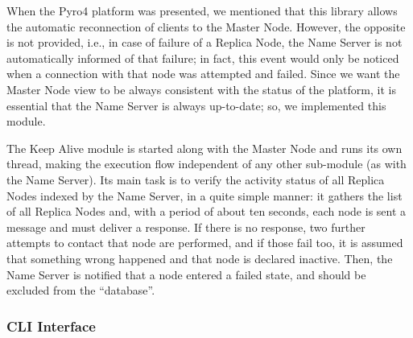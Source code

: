 

When the Pyro4 platform was presented, we mentioned that this library allows the automatic reconnection of clients to the Master Node. However, the opposite is not provided, i.e., in case of failure of a Replica Node, the Name Server is not automatically informed of that failure; in fact, this event would only be noticed when a connection with that node was attempted and failed.
Since we want the Master Node view to be always consistent with the status of the platform, it is essential that the Name Server is always up-to-date; so, we implemented this module.

The Keep Alive module is started along with the Master Node and runs its own thread, making the execution flow independent of any other sub-module (as with the Name Server). Its main task is to verify the activity status of all Replica Nodes indexed by the Name Server, in a quite simple manner: it gathers the list of all Replica Nodes and, with a period of about ten seconds, each node is sent a message and must deliver a response. If there is no response, two further attempts to contact that node are performed, and if those fail too, it is assumed that something wrong happened and that node is declared inactive. Then, the Name Server is notified that a node entered a failed state, and should be excluded from the “database”.

\subsubsection{CLI Interface}
\label{subsub:impl_icbdrep_cli_interface}

